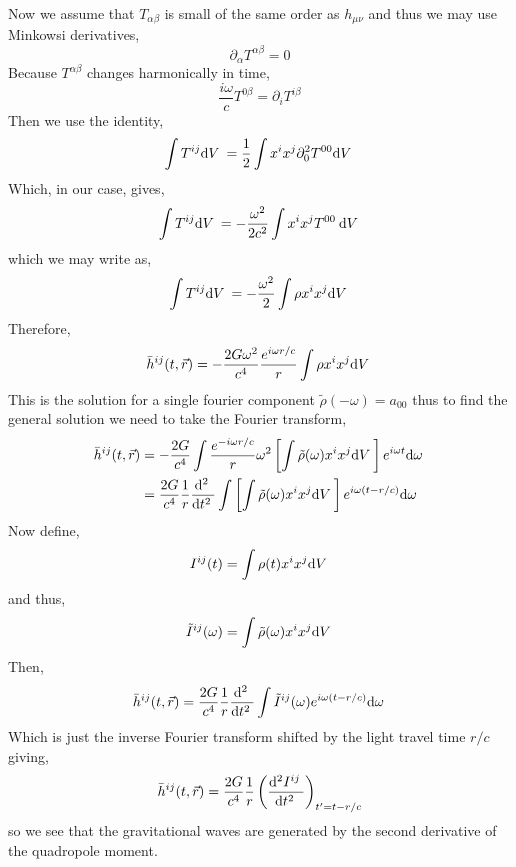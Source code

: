 \documentclass[11pt, a4paper]{article}
\begin{document}
Now we assume that $T_{\alpha \beta}$ is small of the same order as $h_{\mu \nu}$ and thus we may use Minkowsi derivatives,
\[ \partial_\alpha T^{\alpha \beta} = 0 \]
Because $T^{\alpha \beta}$ changes harmonically in time,
\[ \frac{i \omega}{c} T^{0 \beta} = \partial_i T^{i \beta}  \] 
Then we use the identity,
\[ \int T^{ij} \mathrm{d}V \: = \frac{1}{2} \int x^i x^j \partial_0^2 T^{00} \mathrm{d}V \: \]
Which, in our case, gives,
\[ \int T^{ij} \mathrm{d}V \: = - \frac{\omega^2}{2c^2} \int x^i x^j T^{00} \: \mathrm{d}V \: \]
which we may write as,
\[ \int T^{ij} \mathrm{d}V \: = - \frac{\omega^2}{2} \int \rho x^i x^j  \mathrm{d}V \: \]
Therefore,
\[ \bar{h}^{ij}(t, \vec{r})  = - \frac{2 G \omega^2}{c^4} \frac{e^{i \omega r /c}}{r} \int \rho x^i x^j \mathrm{d}V \: \]
This is the solution for a single fourier component $\tilde{\rho}(-\omega) = a_{00}$ thus to find the general solution we need to take the Fourier transform,
\begin{align*}
\bar{h}^{ij}(t, \vec{r}) & = - \frac{2 G}{c^4} \int \frac{e^{-i \omega r / c}}{r} \omega^2 \left[ \int \tilde{\rho}(\omega) x^i x^j \mathrm{d}V \: \right] e^{i \omega t} \mathrm{d}\omega \: 
\\
& = \frac{2 G}{c^4} \frac{1}{r} \frac{\mathrm{d}^{2}  \:}{\mathrm{d}t^{2} \:} \int \left[ \int \tilde{\rho}(\omega) x^i x^j \mathrm{d}V \: \right] e^{i \omega (t - r/c)} \mathrm{d}\omega \:
\end{align*}
Now define,
\[ I^{ij}(t) =  \int \rho(t) x^i x^j \mathrm{d}V \: \]
and thus,
\[ \tilde{I}^{ij}(\omega) =  \int \tilde{\rho}(\omega) x^i x^j \mathrm{d}V \: \]
Then,
\[ \bar{h}^{ij}(t, \vec{r}) = \frac{2 G}{c^4} \frac{1}{r} \frac{\mathrm{d}^{2}  \:}{\mathrm{d}t^{2} \:} \int \tilde{I}^{ij}(\omega) e^{i \omega (t - r/c)} \mathrm{d}\omega \:  \]
Which is just the inverse Fourier transform shifted by the light travel time $r/c$ giving,
\[ \bar{h}^{ij}(t, \vec{r}) = \frac{2 G}{c^4} \frac{1}{r} \left( \frac{\mathrm{d}^{2} I^{ij} \:}{\mathrm{d}t^{2} \:} \right)_{t' = t - r / c} \]
so we see that the gravitational waves are generated by the second derivative of the quadropole moment. 
\end{document}
